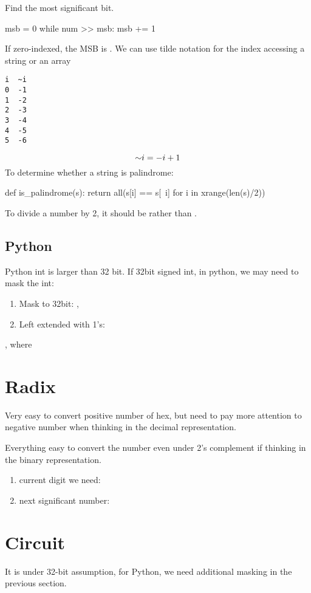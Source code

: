  Find the most significant bit. 
\begin{python}
msb = 0
while num >> msb:
  msb += 1
\end{python}
If zero-indexed, the MSB is .
 We can use tilde notation for the index accessing a string or an array
\begin{lstlisting}
i  ~i  
0  -1
1  -2
2  -3
3  -4 
4  -5 
5  -6
\end{lstlisting}
$$
\mathord{\sim} i = -i+1
$$
To determine whether a string is palindrome:
\begin{python}
def is_palindrome(s):
  return all(s[i] == s[~i] for i in xrange(len(s)/2)) 
\end{python}

 To divide a number by 2, it should be  rather than . 

\subsection{Python}
Python int is larger than 32 bit. 
If 32bit signed int, in python, we may need to mask the int:
\begin{enumerate}
\item Mask to 32bit: , 
\item Left extended with 1's: 
\end{enumerate}

, where 

\section{Radix}
 Very easy to convert positive number of hex, but need to pay more attention to negative number when thinking in the decimal representation. 

Everything easy to convert the number even under 2's complement if thinking in the binary representation. 
\begin{enumerate}
\item current digit we need: 
\item next significant number: 
\end{enumerate}
\section{Circuit}
It is under 32-bit assumption, for Python, we need additional masking in the previous section. 
